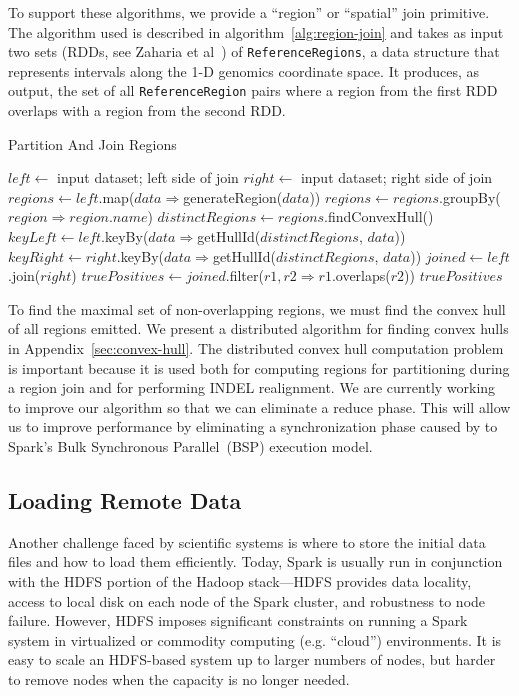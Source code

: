 \documentclass{acm_proc_article-sp}
\begin{document}
To support these algorithms, we provide a ``region'' or ``spatial'' join primitive. The algorithm used is described
in algorithm~\ref{alg:region-join} and takes as input two sets (RDDs, see Zaharia et al~\cite{zaharia12}) of
\texttt{ReferenceRegions}, a data structure that represents intervals along the 1-D genomics coordinate
space. It produces, as output, the set of all \texttt{ReferenceRegion} pairs where a region from the first RDD
overlaps with a region from the second RDD.

\begin{algorithm}
\caption{Partition And Join Regions}
\label{alg:region-join}
\begin{algorithmic}
\STATE $left \leftarrow$ input dataset; left side of join
\STATE $right \leftarrow$ input dataset; right side of join
\STATE $regions \leftarrow left$.map($data \Rightarrow $generateRegion($data$))
\STATE $regions \leftarrow regions$.groupBy($region \Rightarrow region$.$name$)
\STATE $distinctRegions \leftarrow regions$.findConvexHull()
\STATE $keyLeft \leftarrow left$.keyBy($data \Rightarrow $getHullId($distinctRegions$, $data$))
\STATE $keyRight \leftarrow right$.keyBy($data \Rightarrow $getHullId($distinctRegions$, $data$))
\STATE $joined \leftarrow left$.join($right$)
\STATE $truePositives \leftarrow joined$.filter($r1, r2 \Rightarrow r1$.overlaps($r2$))
\RETURN $truePositives$
\end{algorithmic}
\end{algorithm}

To find the maximal set of non-overlapping regions, we must find the convex hull of all regions emitted.
We present a distributed algorithm for finding convex hulls in Appendix~\ref{sec:convex-hull}. The
distributed convex hull computation problem is important because it is used both for computing regions
for partitioning during a region join and for performing INDEL realignment. We are currently working to
improve our algorithm so that we can eliminate a reduce phase. This will allow us to improve
performance by eliminating a synchronization phase caused by to Spark's Bulk Synchronous
Parallel~(BSP) execution model.

\subsection{Loading Remote Data}
\label{sec:loading-remote-data}

Another challenge faced by scientific systems is where to store the initial data files and how to load them
efficiently. Today, Spark is usually run in conjunction with the HDFS portion of the Hadoop stack---HDFS
provides data locality, access to local disk on each node of the Spark cluster, and robustness to node
failure. However, HDFS imposes significant constraints on running a Spark system in virtualized or
commodity computing (e.g. ``cloud'') environments.  It is easy to scale an HDFS-based system up to
larger numbers of nodes, but harder to remove nodes when the capacity is no longer needed.  
\end{document}
